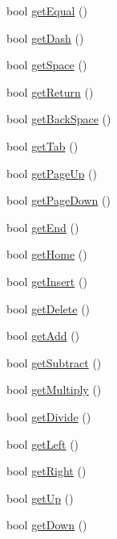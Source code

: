 \begin{DoxyCompactItemize}
\item 
bool \hyperlink{class_keyboard_ab33d990d565c0e9e6de234c2ccd847fd}{get\-Equal} ()
\item 
bool \hyperlink{class_keyboard_a2b629ac3f7efb81b4dd6091894261900}{get\-Dash} ()
\item 
bool \hyperlink{class_keyboard_ab8dc7b677742e216c75f4e4c739bed12}{get\-Space} ()
\item 
bool \hyperlink{class_keyboard_a04482f34bbd2f5d2463acbe07e8b2e56}{get\-Return} ()
\item 
bool \hyperlink{class_keyboard_ab425b0b196ffde8d878097b71884702a}{get\-Back\-Space} ()
\item 
bool \hyperlink{class_keyboard_a0d775a126b75313576041cdaa1ce5fde}{get\-Tab} ()
\item 
bool \hyperlink{class_keyboard_a6da15fa7a8b213e66c97b32411bd8c5a}{get\-Page\-Up} ()
\item 
bool \hyperlink{class_keyboard_ac2a759e6f55eb9faf0fe483df06f0adb}{get\-Page\-Down} ()
\item 
bool \hyperlink{class_keyboard_adbbf01e7ad22f2c1f1253053a90524c2}{get\-End} ()
\item 
bool \hyperlink{class_keyboard_aaa8d566aa66eddbe2a3a3ce5565cb34f}{get\-Home} ()
\item 
bool \hyperlink{class_keyboard_a78814c54bdbb71866480a73bec46c1da}{get\-Insert} ()
\item 
bool \hyperlink{class_keyboard_aa65d80a94c32f9a3180d4c73049165fd}{get\-Delete} ()
\item 
bool \hyperlink{class_keyboard_aafc539a77070e0d53551199bf69877d8}{get\-Add} ()
\item 
bool \hyperlink{class_keyboard_ab251d50b95897e7c69219ea2d3fe1e97}{get\-Subtract} ()
\item 
bool \hyperlink{class_keyboard_a9971de37c9040738efa45a0e51aee175}{get\-Multiply} ()
\item 
bool \hyperlink{class_keyboard_abca2a6295ec794e1547ced02396b4835}{get\-Divide} ()
\item 
bool \hyperlink{class_keyboard_ac8b072ea0e90e87b10470bc92cec1a5c}{get\-Left} ()
\item 
bool \hyperlink{class_keyboard_a33607f70dec11df2ea88dfe7e49d40ef}{get\-Right} ()
\item 
bool \hyperlink{class_keyboard_aeac99170e4a0b5a4a0b58beda53875d5}{get\-Up} ()
\item 
bool \hyperlink{class_keyboard_a9d07f97d9a6d654c768864fbd3beea23}{get\-Down} ()
\item 

\end{DoxyCompactItemize}
